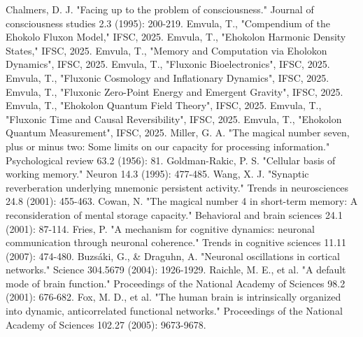 \documentclass[11pt]{article}
\begin{document}

\begin{thebibliography}{9} %
     Chalmers, D. J. "Facing up to the problem of consciousness." Journal of consciousness studies 2.3 (1995): 200-219.
     Emvula, T., "Compendium of the Ehokolo Fluxon Model," IFSC, 2025.
     Emvula, T., "Ehokolon Harmonic Density States," IFSC, 2025.
     Emvula, T., "Memory and Computation via Eholokon Dynamics", IFSC, 2025.
     Emvula, T., "Fluxonic Bioelectronics", IFSC, 2025.
     Emvula, T., "Fluxonic Cosmology and Inflationary Dynamics", IFSC, 2025.
     Emvula, T., "Fluxonic Zero-Point Energy and Emergent Gravity", IFSC, 2025.
     Emvula, T., "Ehokolon Quantum Field Theory", IFSC, 2025.
     Emvula, T., "Fluxonic Time and Causal Reversibility", IFSC, 2025.
     Emvula, T., "Ehokolon Quantum Measurement", IFSC, 2025.
     Miller, G. A. "The magical number seven, plus or minus two: Some limits on our capacity for processing information." Psychological review 63.2 (1956): 81.
     Goldman-Rakic, P. S. "Cellular basis of working memory." Neuron 14.3 (1995): 477-485.
     Wang, X. J. "Synaptic reverberation underlying mnemonic persistent activity." Trends in neurosciences 24.8 (2001): 455-463.
     Cowan, N. "The magical number 4 in short-term memory: A reconsideration of mental storage capacity." Behavioral and brain sciences 24.1 (2001): 87-114.
     Fries, P. "A mechanism for cognitive dynamics: neuronal communication through neuronal coherence." Trends in cognitive sciences 11.11 (2007): 474-480.
     Buzsáki, G., & Draguhn, A. "Neuronal oscillations in cortical networks." Science 304.5679 (2004): 1926-1929.
     Raichle, M. E., et al. "A default mode of brain function." Proceedings of the National Academy of Sciences 98.2 (2001): 676-682.
     Fox, M. D., et al. "The human brain is intrinsically organized into dynamic, anticorrelated functional networks." Proceedings of the National Academy of Sciences 102.27 (2005): 9673-9678.

\end{thebibliography}
\end{document}
